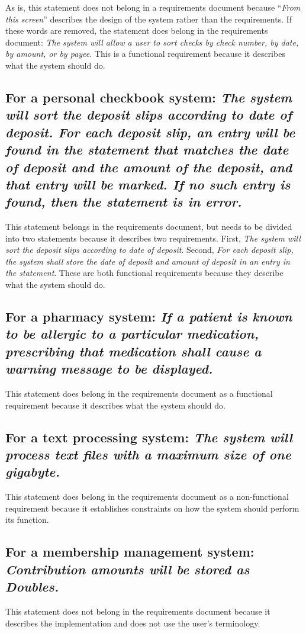 \documentclass[11pt]{article}
\begin{document}
As is, this statement does not belong in a requirements document because ``\textit{From this screen}'' describes the design of the system rather than the requirements.  If these words are removed, the statement does belong in the requirements document: \textit{The system will allow a user to sort checks by check number, by date, by amount, or by payee}. This is a functional requirement because it describes what the system should do.

\subsection{For a personal checkbook system: \textit{The system will sort the deposit slips according to date of deposit. For each deposit slip, an entry will be found in the statement that matches the date of deposit and the amount of the deposit, and that entry will be marked. If no such entry is found, then the statement is in error.}}

This statement belongs in the requirements document, but needs to be divided into two statements because it describes two requirements. First, \textit{The system will sort the deposit slips according to date of deposit}. Second, \textit{For each deposit slip, the system shall store the date of deposit and amount of deposit in an entry in the statement}. These are both functional requirements because they describe what the system should do.

\subsection{For a pharmacy system: \textit{If a patient is known to be allergic to a particular medication, prescribing that medication shall cause a warning message to be displayed.}}

This statement does belong in the requirements document as a functional requirement because it describes what the system should do. 

\subsection{For a text processing system: \textit{The system will process text files with a maximum size of one gigabyte.}}

This statement does belong in the requirements document as a non-functional requirement because it establishes constraints on how the system should perform its function.

\subsection{For a membership management system: \textit{Contribution amounts will be stored as Doubles.}}

This statement does not belong in the requirements document because it describes the implementation and does not use the user's terminology. 


\begin{singlespace}



\end{singlespace}
\end{document}
